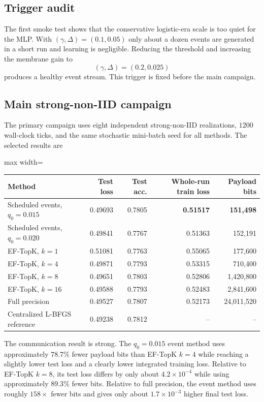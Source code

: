\subsection{Trigger audit}

The first smoke test shows that the conservative logistic-era scale is too quiet for the MLP. With $(\gamma,\Delta)=(0.1,0.05)$ only about a dozen events are generated in a short run and learning is negligible. Reducing the threshold and increasing the membrane gain to
\begin{equation}
  \boxed{(\gamma,\Delta)=(0.2,0.025)}
\end{equation}
produces a healthy event stream. This trigger is fixed before the main campaign.

\subsection{Main strong-non-IID campaign}

The primary campaign uses eight independent strong-non-IID realizations, $1200$ wall-clock ticks, and the same stochastic mini-batch seed for all methods. The selected results are
\begin{center}
\begin{adjustbox}{max width=\textwidth}
\begin{tabular}{lrrrr}
\toprule
Method & Test loss & Test acc. & Whole-run train loss & Payload bits\\
\midrule
Scheduled events, $q_0=0.015$ & 0.49693 & 0.7805 & \textbf{0.51517} & \textbf{151,498}\\
Scheduled events, $q_0=0.020$ & 0.49841 & 0.7767 & 0.51363 & 152,191\\
EF-TopK, $k=1$ & 0.51081 & 0.7763 & 0.55065 & 177,600\\
EF-TopK, $k=4$ & 0.49871 & 0.7793 & 0.53315 & 710,400\\
EF-TopK, $k=8$ & 0.49651 & 0.7803 & 0.52806 & 1,420,800\\
EF-TopK, $k=16$ & 0.49588 & 0.7793 & 0.52483 & 2,841,600\\
Full precision & 0.49527 & 0.7807 & 0.52173 & 24,011,520\\
Centralized L-BFGS reference & 0.49238 & 0.7812 & -- & --\\
\bottomrule
\end{tabular}
\end{adjustbox}
\end{center}

The communication result is strong. The $q_0=0.015$ event method uses approximately $78.7\%$ fewer payload bits than EF-TopK $k=4$ while reaching a slightly lower test loss and a clearly lower integrated training loss. Relative to EF-TopK $k=8$, its test loss differs by only about $4.2\times10^{-4}$ while using approximately $89.3\%$ fewer bits. Relative to full precision, the event method uses roughly $158\times$ fewer bits and gives only about $1.7\times10^{-3}$ higher final test loss.

